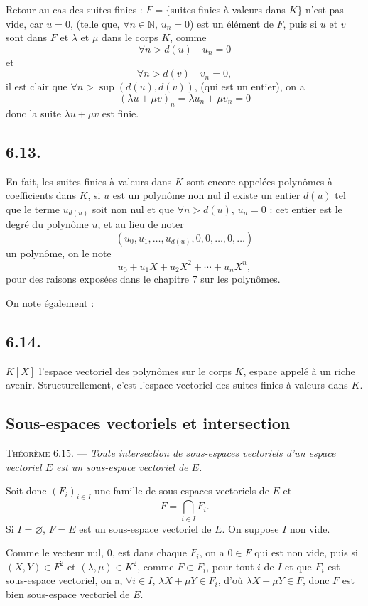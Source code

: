 Retour au cas des suites finies : $F=\{$suites finies à valeurs dans $K\}$ n'est pas vide, car $u=0$, (telle que, $\forall n\in\mathbb N$, $u_n=0$) est un élément de $F$, puis si $u$ et $v$ sont dans $F$ et $\lambda$ et $\mu$ dans le corps $K$, comme
\[
\forall n>d(u)\quad u_n=0
\]
et
\[
\forall n>d(v)\quad v_n=0,
\]
il est clair que $\forall n>\sup(d(u),d(v))$, (qui est un entier), on a
\[
(\lambda u+\mu v)_n=\lambda u_n+\mu v_n=0
\]
donc la suite $\lambda u+\mu v$ est finie.

\subsection*{6.13.}
En fait, les suites finies à valeurs dans $K$ sont encore appelées polynômes à coefficients dans $K$, si $u$ est un polynôme non nul il existe un entier $d(u)$ tel que le terme $u_{d(u)}$ soit non nul et que $\forall n>d(u)$, $u_n=0$ : cet entier est le degré du polynôme $u$, et au lieu de noter
\[
(u_0,u_1,\ldots,u_{d(u)},0,0,\ldots,0,\ldots)
\]
un polynôme, on le note
\[
u_0+u_1X+u_2X^2+\cdots+u_nX^n,
\]
pour des raisons exposées dans le chapitre 7 sur les polynômes.

On note également :

\subsection*{6.14.}
$K[X]$ l'espace vectoriel des polynômes sur le corps $K$, espace appelé à un riche avenir. Structurellement, c'est l'espace vectoriel des suites finies à valeurs dans $K$.

\subsection*{Sous-espaces vectoriels et intersection}

\medskip\noindent\textsc{Théorème 6.15.} --- \emph{Toute intersection de sous-espaces vectoriels d'un espace vectoriel $E$ est un sous-espace vectoriel de $E$.}

Soit donc $(F_i)_{i\in I}$ une famille de sous-espaces vectoriels de $E$ et
\[
F=\bigcap_{i\in I}F_i.
\]
Si $I=\varnothing$, $F=E$ est un sous-espace vectoriel de $E$. On suppose $I$ non vide.

Comme le vecteur nul, 0, est dans chaque $F_i$, on a $0\in F$ qui est non vide, puis si $(X,Y)\in F^2$ et $(\lambda,\mu)\in K^2$, comme $F\subset F_i$, pour tout $i$ de $I$ et que $F_i$ est sous-espace vectoriel, on a, $\forall i\in I$, $\lambda X+\mu Y\in F_i$, d'où $\lambda X+\mu Y\in F$, donc $F$ est bien sous-espace vectoriel de $E$. \bookend

